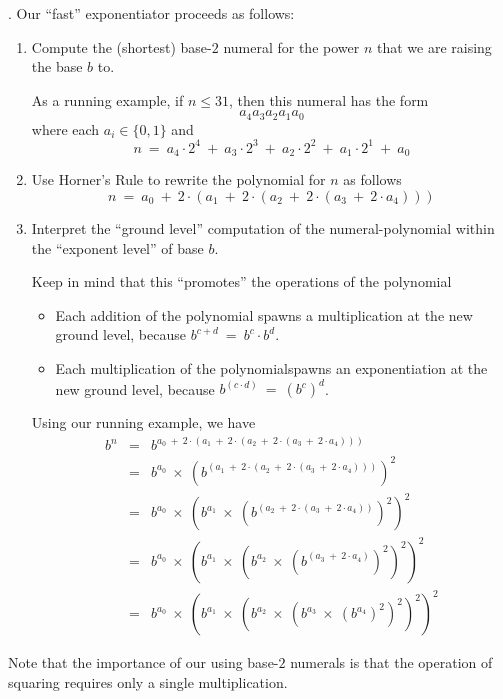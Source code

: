 .
Our ``fast'' exponentiator proceeds as follows:
\begin{enumerate}
\item
Compute the (shortest) base-$2$ numeral for the power $n$ that we
are raising the base $b$ to.

As a running example, if $n \leq 31$, then this numeral has the form
\[ a_4 a_3 a_2 a_1 a_0 \]
where each $a_i \in \{0,1\}$ and
\[ n \ = \
a_4 \cdot 2^4 \ + \  a_3 \cdot 2^3 \ + \  a_2 \cdot 2^2 \ + \  a_1
\cdot 2^1 \ + \ a_0
\] 

\item
Use Horner's Rule to rewrite the polynomial for $n$ as follows
\[ n \ = \
a_0 \ + \ 2 \cdot (a_1 \ + \ 2 \cdot (a_2 \ + \ 2 \cdot (a_3 \ + \
2 \cdot a_4 ))) \]

\item
Interpret the ``ground level'' computation of the numeral-polynomial
within the ``exponent level'' of base $b$.

Keep in mind that this ``promotes'' the operations of the polynomial
\begin{itemize}
\item
Each addition of the polynomial spawns a multiplication at the new
ground level, because $b^{c + d} \ = \ b^c \cdot b^d$.
\item
Each multiplication of the polynomialspawns an exponentiation at the
new ground level, because $b^{(c \cdot d)} \ = \ (b^c)^d$.
\end{itemize}

Using our running example, we have
\begin{eqnarray*}
b^n & = &
 b^{a_0 \ + \ 2 \cdot (a_1 \ + \ 2 \cdot (a_2 \ + \ 2 \cdot (a_3 \ + \
          2 \cdot a_4 )))} \\
    & = &
 b^{a_0} \ \times \ 
\left( b^{
(a_1 \ + \ 2 \cdot (a_2 \ + \ 2 \cdot (a_3 \ + \ 2 \cdot a_4 )))}
\right)^2 \\
    & = &
 b^{a_0} \ \times \
\left(
b^{a_1}  \ \times \
\left(
b^{(a_2 \ + \ 2 \cdot (a_3 \ + \ 2 \cdot a_4 ))}
\right)^2
\right)^2 \\
    & = &
b^{a_0} \ \times \
\left(
b^{a_1}  \ \times \
\left(
b^{a_2}  \ \times \
\left(
b^{(a_3 \ + \ 2 \cdot a_4 )}
\right)^2
\right)^2
\right)^2 \\
    & = &
b^{a_0} \ \times \
\left(
b^{a_1}  \ \times \
\left(
b^{a_2}  \ \times \
\left(
b^{a_3}  \ \times \
\left(
b^{a_4}
\right)^2
\right)^2
\right)^2
\right)^2
\end{eqnarray*}
\end{enumerate}
Note that the importance of our using base-$2$ numerals is that the
operation of squaring requires only a single multiplication.


